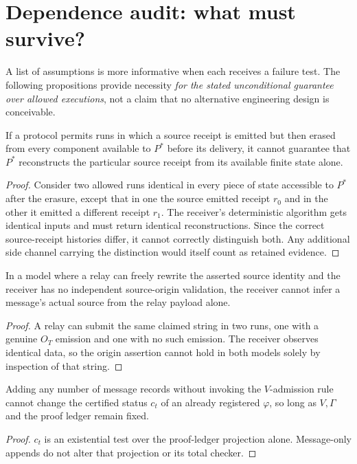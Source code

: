 \documentclass[11pt,letterpaper]{article}
\begin{document}
\section{Dependence audit: what must survive?}
A list of assumptions is more informative when each receives a failure test. The following propositions provide necessity \emph{for the stated unconditional guarantee over allowed executions}, not a claim that no alternative engineering design is conceivable.
\begin{proposition}
If a protocol permits runs in which a source receipt is emitted but then erased from every component available to $P^*$ before its delivery, it cannot guarantee that $P^*$ reconstructs the particular source receipt from its available finite state alone.
\end{proposition}
\begin{proof}
Consider two allowed runs identical in every piece of state accessible to $P^*$ after the erasure, except that in one the source emitted receipt $r_0$ and in the other it emitted a different receipt $r_1$. The receiver's deterministic algorithm gets identical inputs and must return identical reconstructions. Since the correct source-receipt histories differ, it cannot correctly distinguish both. Any additional side channel carrying the distinction would itself count as retained evidence.
\end{proof}
\begin{proposition}
In a model where a relay can freely rewrite the asserted source identity and the receiver has no independent source-origin validation, the receiver cannot infer a message's actual source from the relay payload alone.
\end{proposition}
\begin{proof}
A relay can submit the same claimed string in two runs, one with a genuine $O_T$ emission and one with no such emission. The receiver observes identical data, so the origin assertion cannot hold in both models solely by inspection of that string.
\end{proof}
\begin{proposition}
Adding any number of message records without invoking the $V$-admission rule cannot change the certified status $c_t$ of an already registered $\varphi$, so long as $V,\Gamma$ and the proof ledger remain fixed.
\end{proposition}
\begin{proof}
$c_t$ is an existential test over the proof-ledger projection alone. Message-only appends do not alter that projection or its total checker.
\end{proof}
\end{document}
